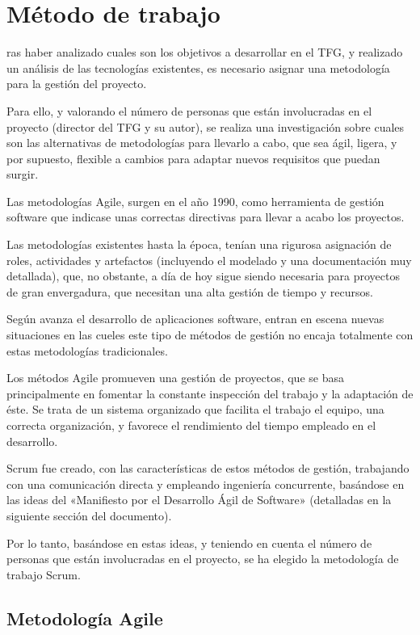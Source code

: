 \chapter{Método de trabajo}
\label{chap:metodo}
ras haber analizado cuales son los objetivos a desarrollar en el TFG, y realizado un análisis de las tecnologías existentes, es necesario asignar una metodología para la gestión del proyecto. 

Para ello, y valorando el número de personas que están involucradas en el proyecto (director del TFG y su autor), se realiza una investigación sobre cuales son las alternativas de metodologías para llevarlo a cabo, que sea ágil, ligera, y por supuesto, flexible a cambios para adaptar nuevos requisitos que puedan surgir.

Las metodologías Agile, surgen en el año 1990, como herramienta de gestión software que indicase unas correctas directivas para llevar a acabo los proyectos. 

Las metodologías existentes hasta la época, tenían una rigurosa asignación de roles, actividades y artefactos (incluyendo el modelado y una documentación muy detallada), que, no obstante, a día de hoy sigue siendo necesaria para proyectos de gran envergadura, que necesitan una alta gestión de tiempo y recursos. 

Según avanza el desarrollo de aplicaciones software, entran en escena nuevas situaciones en las cueles este tipo de métodos de gestión no encaja totalmente con estas metodologías tradicionales. 

Los métodos Agile promueven una gestión de proyectos, que se basa principalmente en fomentar la constante inspección del trabajo y la adaptación de éste. Se trata de un sistema organizado que facilita el trabajo el equipo, una correcta organización, y favorece el rendimiento del tiempo empleado en el desarrollo.

Scrum fue creado, con las características de estos métodos de gestión, trabajando con una comunicación directa y empleando ingeniería concurrente, basándose en las ideas del «Manifiesto por el Desarrollo Ágil de Software» (detalladas en la siguiente sección del documento).

Por lo tanto, basándose en estas ideas, y teniendo en cuenta el número de personas que están involucradas en el proyecto, se ha elegido la metodología de trabajo Scrum.


\section{Metodología Agile}



